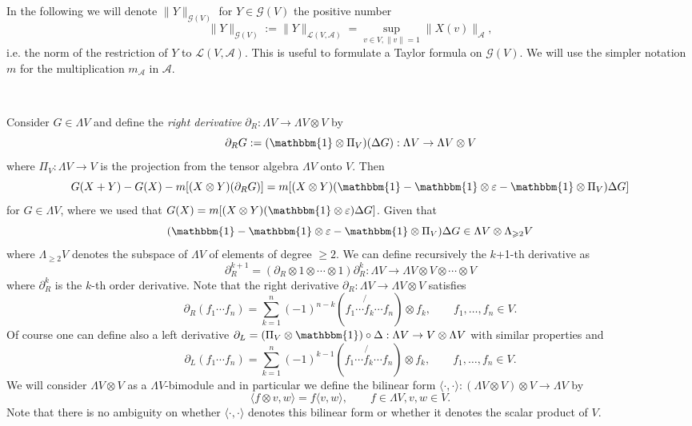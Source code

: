 \documentclass[11pt]{article}
\newcommand{\assign}{:=}
\newcommand{\tmtextit}[1]{{\itshape{#1}}}
\begin{document}
In the following we will denote $\| Y \|_{\mathcal{G} (V)}$ for $Y \in
\mathcal{G} (V)$ the positive number
\[ \| Y \|_{\mathcal{G} (V)} \assign \| Y \|_{\mathcal{L} (V, \mathcal{A})} =
   \sup_{v \in V, \| v \| = 1} \| X (v) \|_{\mathcal{A}}, \]
i.e. the norm of the restriction of $Y$ to $\mathcal{L} (V, \mathcal{A})$.
This is useful to formulate a Taylor formula on $\mathcal{G} (V)$. We will use
the simpler notation $m$ for the multiplication $m_{\mathcal{A}}$ in
$\mathcal{A}$.

\

Consider $G \in \Lambda V$ and define the \tmtextit{right derivative}
$\partial_R : \Lambda V \rightarrow \Lambda V \otimes V$ by
\begin{equation}
  \partial_R G \assign (\mathbbm{1} \otimes \Pi_V) (\Delta G) : \Lambda V
  \rightarrow \Lambda V \otimes V \label{eq:derivativeR}
\end{equation}
where $\Pi_V : \Lambda V \rightarrow V$ is the projection from the tensor
algebra $\Lambda V$ onto $V$. Then
\[ G (X + Y) - G (X) - m [(X \otimes Y) (\partial_R G)] = m [(X \otimes Y)
   (\mathbbm{1}-\mathbbm{1} \otimes \varepsilon -\mathbbm{1} \otimes \Pi_V)
   \Delta G] \]
for $G \in \Lambda V$, where we used that $G (X) = m [(X \otimes Y)
(\mathbbm{1} \otimes \varepsilon) \Delta G]$. Given that
\[ (\mathbbm{1}-\mathbbm{1} \otimes \varepsilon -\mathbbm{1} \otimes \Pi_V)
   \Delta G \in \Lambda V \otimes \Lambda_{\geqslant 2} V \]
where $\Lambda_{\geqslant 2} V$ denotes the subspace of $\Lambda V$ of
elements of degree $\geqslant 2$. We can define recursively the $k$+1-th
derivative as
\[ \partial_R^{k + 1} = (\partial_R \otimes 1 \otimes \cdots \otimes 1)
   \partial_R^k : \Lambda V \rightarrow \Lambda V \otimes V \otimes \cdots
   \otimes V \]
where $\partial_R^k$ is the $k$-th order derivative. Note that the right
derivative $\partial_R : \Lambda V \rightarrow \Lambda V \otimes V$ satisfies
\[ \partial_R (f_1 \cdots f_n) = \sum_{k = 1}^n (- 1)^{n - k} \left( f_1
   \cdots \not{f}_k \cdots f_n \right) \otimes f_k, \qquad f_1, \ldots, f_n
   \in V. \]
Of course one can define also a left derivative $\partial_L = (\Pi_V \otimes
\mathbbm{1}) \circ \Delta : \Lambda V \rightarrow V \otimes \Lambda V$ with
similar properties and
\[ \partial_L (f_1 \cdots f_n) = \sum_{k = 1}^n (- 1)^{k - 1} \left( f_1
   \cdots \not{f_k} \cdots f_n \right) \otimes f_k, \qquad f_1, \ldots, f_n
   \in V. \]
We will consider $\Lambda V \otimes V$ as a $\Lambda V$-bimodule and in
particular we define the bilinear form $\langle \cdot, \cdot \rangle :
(\Lambda V \otimes V) \otimes V \rightarrow \Lambda V$ by
\begin{equation}
  \langle f \otimes v, w \rangle = f \langle v, w \rangle, \qquad f \in
  \Lambda V, v, w \in V. \label{eq:bimodule}
\end{equation}
Note that there is no ambiguity on whether $\langle \cdot, \cdot \rangle$
denotes this bilinear form or whether it denotes the scalar product of $V$.
\end{document}
